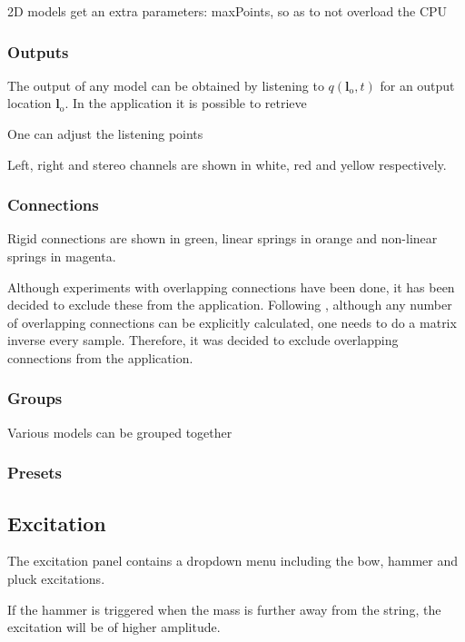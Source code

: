 \documentclass{article}
\begin{document}
2D models get an extra parameters: maxPoints, so as to not overload the CPU 

\subsubsection{Outputs}
The output of any model can be obtained by listening to $q(\boldsymbol{l}_\text{o}, t)$ for an output location $\boldsymbol{l}_\text{o}$. In the application it is possible to retrieve 

One can adjust the listening points 

Left, right and stereo channels are shown in white, red and yellow respectively. 

\subsubsection{Connections}
Rigid connections are shown in green, linear springs in orange and non-linear springs in magenta. 

Although experiments with overlapping connections have been done, it has been decided to exclude these from the application. Following \cite{Bilbao2009Modular}, although any number of overlapping connections can be explicitly calculated, one needs to do a matrix inverse every sample. Therefore, it was decided to exclude overlapping connections from the application. 


\subsubsection{Groups}
Various models can be grouped together
\subsubsection{Presets}

\subsection{Excitation}
The excitation panel contains a dropdown menu including the bow, hammer and pluck excitations.

If the hammer is triggered when the mass is further away from the string, the excitation will be of higher amplitude.
\end{document}
